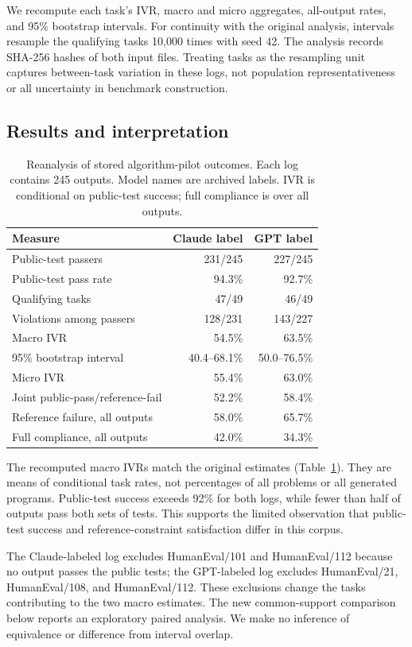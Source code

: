 \documentclass[manuscript,screen,review,anonymous]{acmart}
\begin{document}
We recompute each task's IVR, macro and micro aggregates, all-output rates, and 95\% bootstrap intervals. For continuity with the original analysis, intervals resample the qualifying tasks 10,000 times with seed 42. The analysis records SHA-256 hashes of both input files. Treating tasks as the resampling unit captures between-task variation in these logs, not population representativeness or all uncertainty in benchmark construction.

\subsection{Results and interpretation}
\begin{table}[t]
\centering
\caption{Reanalysis of stored algorithm-pilot outcomes. Each log contains 245 outputs. Model names are archived labels. IVR is conditional on public-test success; full compliance is over all outputs.}
\label{tab:pilot}
\begin{tabular}{lrr}
\toprule
Measure & Claude label & GPT label \\
\midrule
Public-test passers & 231/245 & 227/245 \\
Public-test pass rate & 94.3\% & 92.7\% \\
Qualifying tasks & 47/49 & 46/49 \\
Violations among passers & 128/231 & 143/227 \\
Macro IVR & 54.5\% & 63.5\% \\
95\% bootstrap interval & 40.4--68.1\% & 50.0--76.5\% \\
Micro IVR & 55.4\% & 63.0\% \\
Joint public-pass/reference-fail & 52.2\% & 58.4\% \\
Reference failure, all outputs & 58.0\% & 65.7\% \\
Full compliance, all outputs & 42.0\% & 34.3\% \\
\bottomrule
\end{tabular}
\end{table}

The recomputed macro IVRs match the original estimates (Table~\ref{tab:pilot}). They are means of conditional task rates, not percentages of all problems or all generated programs. Public-test success exceeds 92\% for both logs, while fewer than half of outputs pass both sets of tests. This supports the limited observation that public-test success and reference-constraint satisfaction differ in this corpus.

The Claude-labeled log excludes HumanEval/101 and HumanEval/112 because no output passes the public tests; the GPT-labeled log excludes HumanEval/21, HumanEval/108, and HumanEval/112. These exclusions change the tasks contributing to the two macro estimates. The new common-support comparison below reports an exploratory paired analysis. We make no inference of equivalence or difference from interval overlap.
\end{document}
